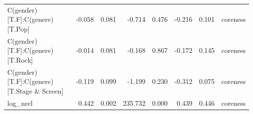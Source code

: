 \begin{table}
\begin{tabular}{lrrrrrrl}
                   C(gender)[T.F]:C(genere)[T.Pop] & -0.058 & 0.081 &  -0.714 & 0.476 & -0.216 &  0.101 & coreness \\
                  C(gender)[T.F]:C(genere)[T.Rock] & -0.014 & 0.081 &  -0.168 & 0.867 & -0.172 &  0.145 & coreness \\
        C(gender)[T.F]:C(genere)[T.Stage \& Screen] & -0.119 & 0.099 &  -1.199 & 0.230 & -0.312 &  0.075 & coreness \\
                                          log\_nrel &  0.442 & 0.002 & 235.732 & 0.000 &  0.439 &  0.446 & coreness \\
\bottomrule
\end{tabular}
\end{table}
